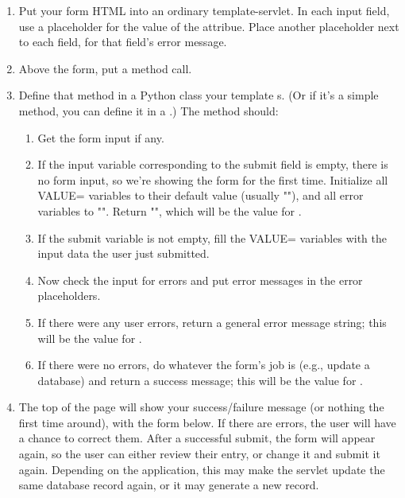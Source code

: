 \begin{enumerate}
\item Put your form HTML into an ordinary template-servlet.  In each input 
    field, use a placeholder for the value of the  attribue.
    Place another placeholder next to each field, for that field's error
    message.
\item Above the form, put a  method call.
\item Define that method in a Python class your template s.  (Or
    if it's a simple method, you can define it in a .)  The method
    should:
    \begin{enumerate}
    \item Get the form input if any.
    \item If the input variable corresponding to the submit field is empty,
        there is no form input, so we're showing the form for the first time.
        Initialize all VALUE= variables to their default value (usually ""),
        and all error variables to "".  Return "", which will be the value for
        .
    \item If the submit variable is not empty, fill the VALUE= variables with
        the input data the user just submitted.
    \item Now check the input for errors and put error messages in the error
        placeholders.  
    \item If there were any user errors, return a general error message
        string; this will be the value for .
    \item If there were no errors, do whatever the form's job is (e.g., update
        a database) and return a success message; this will be the value for
        .
    \end{enumerate}
\item The top of the page will show your success/failure message (or nothing
the first time around), with the form below.  If there are errors, the user
will have a chance to correct them.  After a successful submit, the form will
appear again, so the user can either review their entry, or change it and
submit it again.  Depending on the application, this may make the servlet
update the same database record again, or it may generate a new record.
\end{enumerate}


